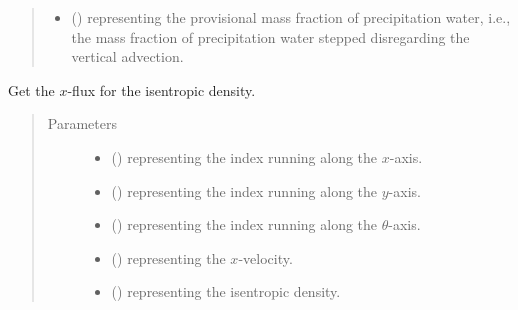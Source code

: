 \documentclass[letterpaper,10pt,english]{sphinxmanual}
\begin{document}
\begin{fulllineitems}
\begin{fulllineitems}
\begin{quote}
\begin{description}
\begin{itemize}
\item {} 
 () \textendash{}  representing the provisional mass fraction of precipitation water,
i.e., the mass fraction of precipitation water stepped disregarding the vertical advection.

\end{itemize}

\end{description}\end{quote}

\end{fulllineitems}


\begin{fulllineitems}
\label{\detokenize{api:dycore.flux_isentropic_nonconservative_centered.FluxIsentropicNonconservativeCentered._get_centered_flux_x_s}}
Get the \(x\)-flux for the isentropic density.
\begin{quote}\begin{description}
\item[{Parameters}] \leavevmode\begin{itemize}
\item {} 
 () \textendash{}  representing the index running along the \(x\)-axis.

\item {} 
 () \textendash{}  representing the index running along the \(y\)-axis.

\item {} 
 () \textendash{}  representing the index running along the \(\theta\)-axis.

\item {} 
 () \textendash{}  representing the \(x\)-velocity.

\item {} 
 () \textendash{}  representing the isentropic density.


\end{itemize}
\end{description}
\end{quote}
\end{fulllineitems}
\end{fulllineitems}
\end{document}
